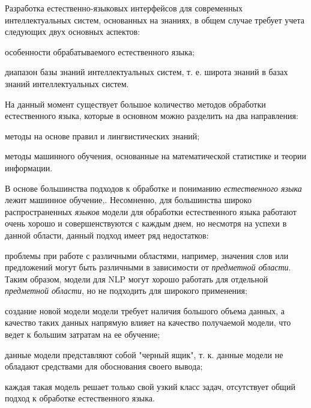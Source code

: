 Разработка естественно-языковых интерфейсов для современных интеллектуальных систем, основанных на знаниях, в общем случае требует учета следующих двух основных аспектов:
\begin{textitemize}
	\item особенности обрабатываемого естественного языка;
	\item диапазон базы знаний интеллектуальных систем, т. е. широта знаний в базах знаний интеллектуальных систем.
\end{textitemize}

На данный момент существует большое количество методов обработки естественного языка, которые в основном можно разделить на два направления:
\begin{textitemize}
	\item методы на основе правил и лингвистических знаний;
	\item методы машинного обучения, основанные на математической статистике и теории информации.
\end{textitemize}

В основе большинства подходов к обработке и пониманию \textit{естественного языка} лежит машинное обучение,.
Несомненно, для большинства широко распространенных \textit{языков} модели для обработки естественного языка работают очень хорошо и совершенствуются с каждым днем, но несмотря на успехи в данной области, данный подход имеет ряд недостатков:
\begin{textitemize}
    \item проблемы при работе с различными областями, например, значения слов или предложений могут быть различными в зависимости от \textit{предметной области}.
    Таким образом, модели для NLP могут хорошо работать для отдельной \textit{предметной области}, но не подходить для широкого применения;
    \item создание новой модели модели требует наличия большого объема данных, а качество таких данных напрямую влияет на качество получаемой модели, что ведет к большим затратам на ее обучение;
    \item данные модели представляют собой "черный ящик"{}, т. к. данные модели не обладают средствами для обоснования своего вывода;
    \item каждая такая модель решает только свой узкий класс задач, отсутствует общий подход к обработке естественного языка.
\end{textitemize}

